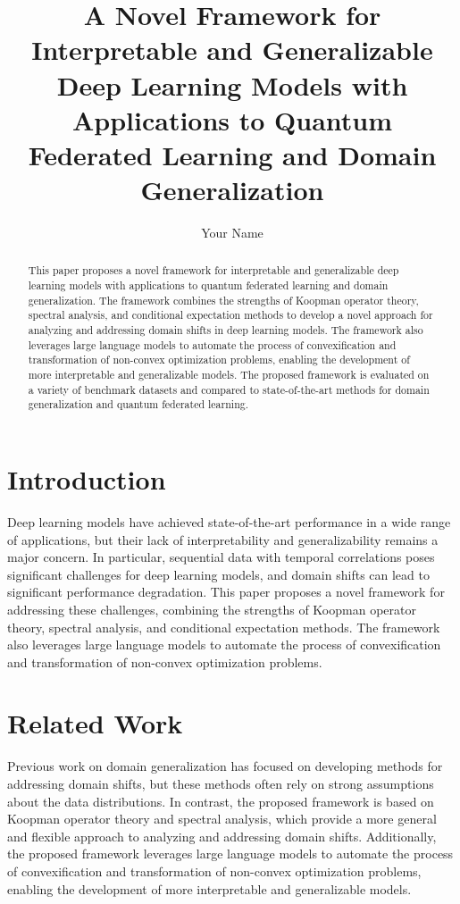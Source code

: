 \documentclass{article}
\begin{document}
\title{A Novel Framework for Interpretable and Generalizable Deep Learning Models with Applications to Quantum Federated Learning and Domain Generalization}

\author{Your Name}

\maketitle

\begin{abstract}
This paper proposes a novel framework for interpretable and generalizable deep learning models with applications to quantum federated learning and domain generalization. The framework combines the strengths of Koopman operator theory, spectral analysis, and conditional expectation methods to develop a novel approach for analyzing and addressing domain shifts in deep learning models. The framework also leverages large language models to automate the process of convexification and transformation of non-convex optimization problems, enabling the development of more interpretable and generalizable models. The proposed framework is evaluated on a variety of benchmark datasets and compared to state-of-the-art methods for domain generalization and quantum federated learning.
\end{abstract}

\section{Introduction}

Deep learning models have achieved state-of-the-art performance in a wide range of applications, but their lack of interpretability and generalizability remains a major concern. In particular, sequential data with temporal correlations poses significant challenges for deep learning models, and domain shifts can lead to significant performance degradation. This paper proposes a novel framework for addressing these challenges, combining the strengths of Koopman operator theory, spectral analysis, and conditional expectation methods. The framework also leverages large language models to automate the process of convexification and transformation of non-convex optimization problems.

\section{Related Work}

Previous work on domain generalization has focused on developing methods for addressing domain shifts, but these methods often rely on strong assumptions about the data distributions. In contrast, the proposed framework is based on Koopman operator theory and spectral analysis, which provide a more general and flexible approach to analyzing and addressing domain shifts. Additionally, the proposed framework leverages large language models to automate the process of convexification and transformation of non-convex optimization problems, enabling the development of more interpretable and generalizable models.
\end{document}
